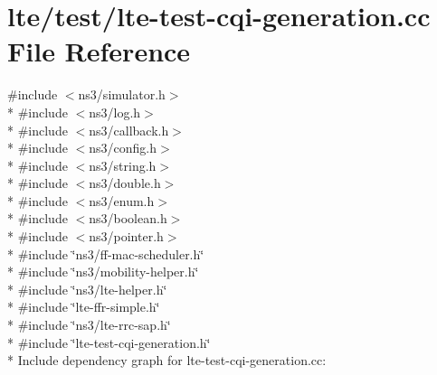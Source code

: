 \hypertarget{lte-test-cqi-generation_8cc}{}\section{lte/test/lte-\/test-\/cqi-\/generation.cc File Reference}
\label{lte-test-cqi-generation_8cc}
{\ttfamily \#include $<$ns3/simulator.\+h$>$}\\*
{\ttfamily \#include $<$ns3/log.\+h$>$}\\*
{\ttfamily \#include $<$ns3/callback.\+h$>$}\\*
{\ttfamily \#include $<$ns3/config.\+h$>$}\\*
{\ttfamily \#include $<$ns3/string.\+h$>$}\\*
{\ttfamily \#include $<$ns3/double.\+h$>$}\\*
{\ttfamily \#include $<$ns3/enum.\+h$>$}\\*
{\ttfamily \#include $<$ns3/boolean.\+h$>$}\\*
{\ttfamily \#include $<$ns3/pointer.\+h$>$}\\*
{\ttfamily \#include \char`\"{}ns3/ff-\/mac-\/scheduler.\+h\char`\"{}}\\*
{\ttfamily \#include \char`\"{}ns3/mobility-\/helper.\+h\char`\"{}}\\*
{\ttfamily \#include \char`\"{}ns3/lte-\/helper.\+h\char`\"{}}\\*
{\ttfamily \#include \char`\"{}lte-\/ffr-\/simple.\+h\char`\"{}}\\*
{\ttfamily \#include \char`\"{}ns3/lte-\/rrc-\/sap.\+h\char`\"{}}\\*
{\ttfamily \#include \char`\"{}lte-\/test-\/cqi-\/generation.\+h\char`\"{}}\\*
Include dependency graph for lte-\/test-\/cqi-\/generation.cc\+:
